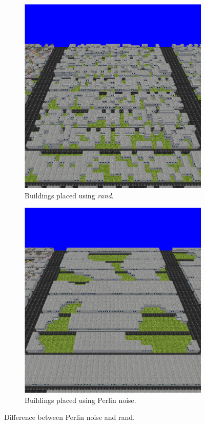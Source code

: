 	\begin{figure}[h]
		\centering
		\begin{subfigure}{0.45\textwidth}
			\centering
			\includegraphics[width=0.9\linewidth]{"Images/rand vacant"}
			\caption{Buildings placed using \textit{rand}.}
			\label{fig:rand-vacant}
		\end{subfigure}
		\begin{subfigure}{0.45\textwidth}
			\centering
			\includegraphics[width=0.9\linewidth]{"Images/perlin vacant"}
			\caption{Buildings placed using Perlin noise.}
			\label{fig:perlin-vacant}
		\end{subfigure}
		\caption{Difference between Perlin noise and rand.}
		\label{fig:perlin-rand-vacant}
	\end{figure}
	
